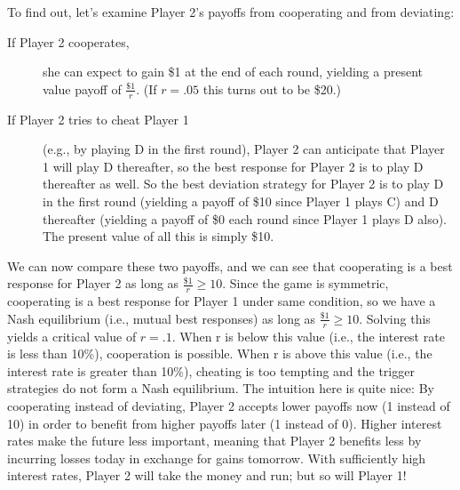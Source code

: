 To find out, let's examine Player 2's payoffs from cooperating and from deviating:
\begin{description}
\item [If Player 2 cooperates,] she can expect to gain \$1 at the end of each round, yielding a present value payoff of $\displaystyle\frac{\$1}{r}$. (If $r=.05$ this turns out to be \$20.)

\item [If Player 2 tries to cheat Player 1] (e.g., by playing D in the first round), Player 2 can anticipate that Player 1 will play D thereafter, so the best response for Player 2 is to play D thereafter as well. So the best deviation strategy for Player 2 is to play D in the first round (yielding a payoff of \$10 since Player 1 plays C) and D thereafter (yielding a payoff of \$0 each round since Player 1 plays D also). The present value of all this is simply \$10.
\end{description}
%
We can now compare these two payoffs, and we can see that cooperating is a best response for Player 2 as long as $\displaystyle\frac{\$1}{r} \geq  10$. Since the game is symmetric, cooperating is a best response for Player 1 under same condition, so we have a Nash equilibrium (i.e., mutual best responses) as long as $\displaystyle\frac{\$1}{r} \geq  10$. Solving this yields a critical value of $r=.1$. When r is below this value (i.e., the interest rate is less than 10\%), cooperation is possible. When r is above this value (i.e., the interest rate is greater than 10\%), cheating is too tempting and the trigger strategies do not form a Nash equilibrium. The intuition here is quite nice: By cooperating instead of deviating, Player 2 accepts lower payoffs now (1 instead of 10) in order to benefit from higher payoffs later (1 instead of 0). Higher interest rates make the future less important, meaning that Player 2 benefits less by incurring losses today in exchange for gains tomorrow. With sufficiently high interest rates, Player 2 will take the money and run; but so will Player 1!























